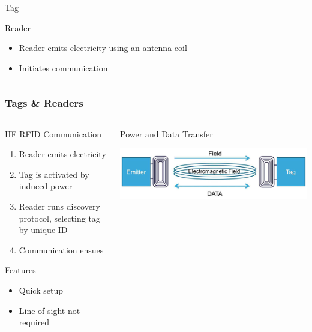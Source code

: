 \documentclass[unknownkeysallowed]{beamer}
\begin{document}
\begin{frame}
\begin{columns}[T]
\begin{column}{.5\textwidth}
\begin{block}{Tag}
\begin{itemize}
   		\end{itemize}
    	\end{block}
        \begin{block}{Reader}
    	\begin{itemize}
		    \item{Reader emits electricity using an antenna coil}
		    \item{Initiates communication}
   		\end{itemize}
    \end{block}
    \end{column}
  \end{columns}
\end{frame}


\begin{frame}
\frametitle{Tags \& Readers}
  \begin{columns}[T]
    \begin{column}{.5\textwidth}
     \begin{block}{HF RFID Communication}
		\begin{enumerate}
		    \item{Reader emits electricity}
		    \item{Tag is activated by induced power}
        	\item{Reader runs discovery protocol, selecting tag by unique ID}
        	\item{Communication ensues}
   		\end{enumerate}
    \end{block}
         \begin{block}{Features}
		\begin{itemize}
        	\item{Quick setup}
        	\item{Line of sight not required}
   		\end{itemize}
    \end{block}
    \end{column}
    \begin{column}{.5\textwidth}
    \begin{block}{}
     \begin{center}
     Power and Data Transfer
     \end{center}
    \includegraphics{../TomPaper/figures/emitterAndTag.png}
    \end{block}
    \end{column}
  \end{columns}
\end{frame}
\end{document}
